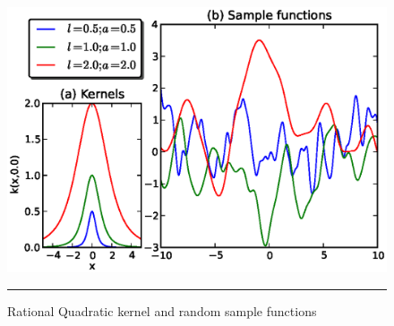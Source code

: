 \begin{figure}[t]
	\centering
		\includegraphics[width=14cm,keepaspectratio]{diagrams/RQ_edit_cov.eps}
		\rule{35em}{0.5pt}
	\caption[Rational Quadratic kernel and random sample functions]
		{Rational Quadratic kernel and random sample functions}
	\label{fig:Rational_Quadratic_covariance}
\end{figure}


